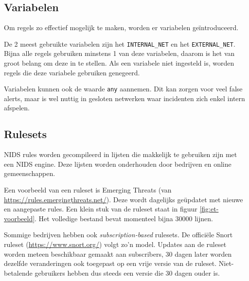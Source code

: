 \documentclass[a4paper,12pt]{report}
\begin{document}
\subsection{Variabelen}
Om regels zo effectief mogelijk te maken, worden er variabelen geïntroduceerd.

De 2 meest gebruikte variabelen zijn het \lstinline|INTERNAL_NET| en het \lstinline|EXTERNAL_NET|.
Bijna alle regels gebruiken minstens 1 van deze variabelen, daarom is het van groot belang om deze in te stellen.
Als een variabele niet ingesteld is, worden regels die deze variabele gebruiken genegeerd.

Variabelen kunnen ook de waarde \lstinline|any| aannemen.
Dit kan zorgen voor veel false alerts, maar is wel nuttig in gesloten netwerken waar incidenten zich enkel intern afspelen.

\subsection{Rulesets}
NIDS rules worden gecompileerd in lijsten die makkelijk te gebruiken zijn met een NIDS engine.
Deze lijsten worden onderhouden door bedrijven en online gemeenschappen.

Een voorbeeld van een ruleset is Emerging Threats (van \url{https://rules.emergingthreats.net/}).
Deze wordt dagelijks geüpdatet met nieuwe en aangepaste rules.
Een klein stuk van de ruleset staat in figuur \ref{fig:et-voorbeeld}.
Het volledige bestand bevat momenteel bijna $30000$ lijnen.

Sommige bedrijven hebben ook \emph{subscription-based} rulesets.
De officiële Snort ruleset (\url{https://www.snort.org/}) volgt zo'n model.
Updates aan de ruleset worden meteen beschikbaar gemaakt aan subscribers, 30 dagen later worden dezelfde veranderingen ook toegepast op een vrije versie van de ruleset.
Niet-betalende gebruikers hebben dus steeds een versie die 30 dagen ouder is.
\end{document}
